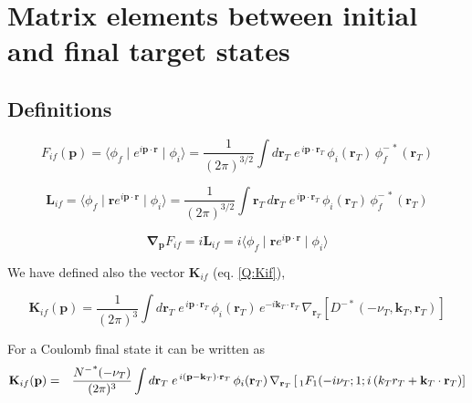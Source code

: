 \chapter{Matrix elements between initial and final target states}

\section{Definitions}
\label{S:definitions}


\label{S:FGKL-if}

\begin{equation}\label{Q:Fif-def}
  F_{if}(\bm{p}) = \langle \phi_{f}\mid e^{i \bm{p}\cdot \bm{r}}\mid \phi_{i} \rangle = \frac{1}{(2 \pi)^{3/2}} \int d  \bm{r}_{T} \; e^{\, i \bm{p} \cdot \bm{r}_{T}} \, \phi_{i}(\bm{r}_{T}) \, \phi^{-\, \ast}_{f}(\bm{r}_T)
\end{equation}

\begin{equation}\label{Q:Lif-def}
\bm{L}_{if} = \langle \phi_{f}\mid  \bm{r} e^{i \bm{p}\cdot
\bm{r}}\mid \phi_{i} \rangle = \frac{1}{(2 \pi)^{3/2}} \int \bm{r}_{T}
\, d \bm{r}_{T} \; e^{\, i \bm{p} \cdot \bm{r}_{T}} \,
\phi_{i}(\bm{r}_{T}) \,
 \phi^{-\, \ast}_{f}(\bm{r}_T)
\end{equation}

\begin{equation}\label{Q:Fif-Lif-relat}
\bm{\nabla}_{\bm{p}} F_{if} = i \bm{L}_{if} =i \langle \phi_{f}\mid  \bm{r}
e^{i \bm{p}\cdot \bm{r}}\mid \phi_{i} \rangle
\end{equation}
%

We have defined also the vector $\bm{K}_{if}$ (eq. \ref{Q:Kif}),

\begin{equation}\label{Q:Kif-def}
  \bm{K}_{if}(\bm{p})= \frac{1}{(2 \pi)^{3}} \int d \bm{r}_{T} \;
e^{\, i \bm{p} \cdot \bm{r}_{T}} \, \phi_{i}(\bm{r}_{T}) \,
e^{- i \bm{k}_{T} \cdot \bm{r}_{T}} \,\nabla_{\bm{r}_{T}} \left[
D^{-*}(-\nu_{T},\bm{k}_{T},\bm{r}_{T}) \right]
\end{equation}

For a Coulomb final state it can be written as
\begin{eqnarray*}
\mathbf{K}_{if}(\mathbf{p}) &=& \frac{{N^{-}}^{*}(-\nu_{T})}{(2 \pi)^{3}} \int
d \mathbf{r}_{T} \; e^{\, i \left( \mathbf{p}- \mathbf{k}_{T} \right)
\cdot \mathbf{r}_{T}} \, \phi_{i}(\mathbf{r}_{T}) \,\nabla_{\mathbf{r}_{T}} \left[
\,{_{1}F_{1}}(- i \nu_{T}; 1; i \left( k_{T} r_{T} + \mathbf{k}_{T}
\cdot
\mathbf{r}_{T} \right) \right] \nonumber \\
\end{eqnarray*}


